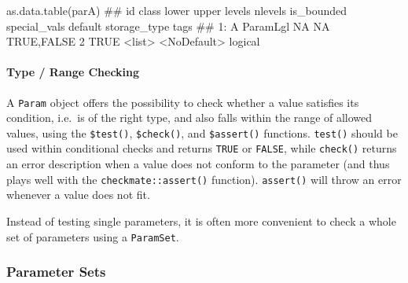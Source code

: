 \documentclass[
  11pt,
  parskip=half,
  DIV=calc,
  BCOR=10mm,
  x11names]{scrbook}
\newenvironment{Shaded}{}{}
\newcommand{\KeywordTok}[1]{\textcolor[rgb]{0.00,0.00,1.00}{#1}}
\newcommand{\NormalTok}[1]{#1}
\newcommand{\OperatorTok}[1]{#1}
\newcommand{\OtherTok}[1]{\textcolor[rgb]{1.00,0.25,0.00}{#1}}
\newcommand{\StringTok}[1]{\textcolor[rgb]{0.00,0.50,0.50}{#1}}
\begin{document}
\begin{Shaded}
\begin{Highlighting}[]
\KeywordTok{as.data.table}\NormalTok{(parA)}
\NormalTok{##    id    class lower upper      levels nlevels is_bounded special_vals     default storage_type tags}
\NormalTok{## 1:  A ParamLgl    NA    NA  TRUE,FALSE       2       TRUE       <list> <NoDefault>      logical}
\end{Highlighting}
\end{Shaded}

\hypertarget{type-range-checking}{%
\paragraph{Type / Range Checking}\label{type-range-checking}}

A \texttt{Param} object offers the possibility to check whether a value satisfies its condition, i.e.~is of the right type, and also falls within the range of allowed values, using the \texttt{\$test()}, \texttt{\$check()}, and \texttt{\$assert()} functions.
\texttt{test()} should be used within conditional checks and returns \texttt{TRUE} or \texttt{FALSE}, while \texttt{check()} returns an error description when a value does not conform to the parameter (and thus plays well with the \texttt{checkmate::assert()} function).
\texttt{assert()} will throw an error whenever a value does not fit.

\begin{Shaded}
\end{Shaded}

Instead of testing single parameters, it is often more convenient to check a whole set of parameters using a \texttt{ParamSet}.

\hypertarget{parameter-sets}{%
\subsubsection{Parameter Sets}\label{parameter-sets}}
\end{document}
